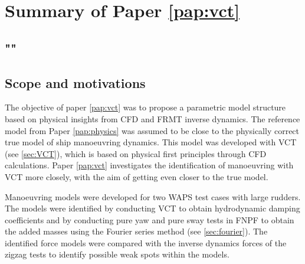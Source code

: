 \section{Summary of Paper \ref{pap:vct}}
\subsection*{""}
\subsection*{Scope and motivations}
The objective of paper \ref{pap:vct} was to propose a parametric model structure based on physical insights from CFD and FRMT inverse dynamics. The reference model from Paper \ref{pap:physics} was assumed to be close to the physically correct true model of ship manoeuvring dynamics. This model was developed with VCT (see \ref{sec:VCT}), which is based on physical first principles through CFD calculations. Paper \ref{pap:vct} investigates the identification of manoeuvring with VCT more closely, with the aim of getting even closer to the true model.

Manoeuvring models were developed for two WAPS test cases with large rudders. The models were identified by conducting VCT to obtain hydrodynamic damping coefficients and by conducting pure yaw and pure sway tests in FNPF to obtain the added masses using the Fourier series method (see \autoref{sec:fourier}). The identified force models were compared with the inverse dynamics forces of the zigzag tests to identify possible weak spots within the models.


